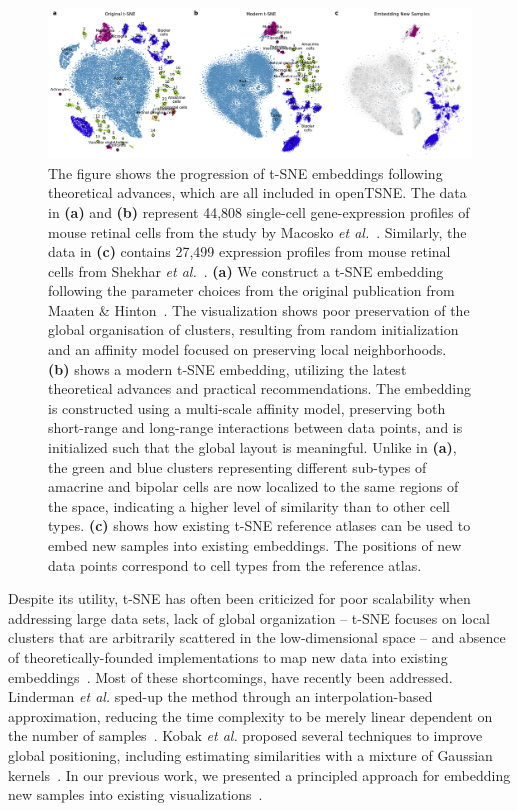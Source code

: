 \documentclass[twocolumn]{bmcart}
\newcommand{\opentsne}{\textsf{openTSNE}}
\begin{document}
\begin{figure}[htbp]
  \includegraphics[width=\textwidth]{macosko2015}
  \caption{\label{fig:macosko}The figure shows the progression of t-SNE embeddings following theoretical advances, which are all included in \opentsne. The data in \textbf{(a)} and \textbf{(b)} represent 44,808 single-cell gene-expression profiles of mouse retinal cells from the study by Macosko \textit{et al.}~\cite{macosko2015highly}. Similarly, the data in \textbf{(c)} contains 27,499 expression profiles from mouse retinal cells from Shekhar \textit{et al.}~\cite{shekhar2016comprehensive}. \textbf{(a)} We construct a t-SNE embedding following the parameter choices from the original publication from Maaten \& Hinton~\cite{maaten2008visualizing}. The visualization shows poor preservation of the global organisation of clusters, resulting from random initialization and an affinity model focused on preserving local neighborhoods. \textbf{(b)} shows a modern t-SNE embedding, utilizing the latest theoretical advances and practical recommendations. The embedding is constructed using a multi-scale affinity model, preserving both short-range and long-range interactions between data points, and is initialized such that the global layout is meaningful. Unlike in \textbf{(a)}, the green and blue clusters representing different sub-types of amacrine and bipolar cells are now localized to the same regions of the space, indicating a higher level of similarity than to other cell types. \textbf{(c)} shows how existing t-SNE reference atlases can be used to embed new samples into existing embeddings. The positions of new data points correspond to cell types from the reference atlas.}
\end{figure}

Despite its utility, t-SNE has often been criticized for poor scalability when
addressing large data sets, lack of global organization -- t-SNE focuses on local
clusters that are arbitrarily scattered in the low-dimensional space  -- and
absence of theoretically-founded implementations to map new data into existing
embeddings~\cite{ding2018interpretable,becht2019dimensionality}. Most of these
shortcomings, have recently been addressed. Linderman \textit{et
al.} sped-up the method through an interpolation-based
approximation, reducing the time complexity to be merely linear dependent on
the number of samples~\cite{linderman2019fast}. Kobak \textit{et al.} proposed
several techniques to improve global positioning, including estimating
similarities with a mixture of Gaussian kernels~\cite{kobak2019art}. In our previous work, we presented
a principled approach for embedding new samples into existing visualizations~\cite{policar2019embedding}.
\end{document}
